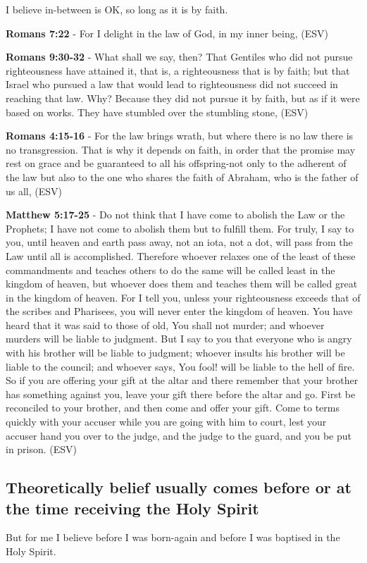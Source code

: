 \documentclass[11pt]{article}
\begin{document}
I believe in-between is OK, so long as it is by faith.

\textbf{Romans 7:22} - For I delight in the law of God, in my inner being, (ESV)

\textbf{Romans 9:30-32} - What shall we say, then? That Gentiles who did not pursue righteousness have attained it, that is, a righteousness that is by faith; but that Israel who pursued a law that would lead to righteousness did not succeed in reaching that law. Why? Because they did not pursue it by faith, but as if it were based on works. They have stumbled over the stumbling stone, (ESV)

\textbf{Romans 4:15-16} - For the law brings wrath, but where there is no law there is no transgression. That is why it depends on faith, in order that the promise may rest on grace and be guaranteed to all his offspring-not only to the adherent of the law but also to the one who shares the faith of Abraham, who is the father of us all, (ESV)

\textbf{Matthew 5:17-25} - Do not think that I have come to abolish the Law or the Prophets; I have not come to abolish them but to fulfill them. For truly, I say to you, until heaven and earth pass away, not an iota, not a dot, will pass from the Law until all is accomplished. Therefore whoever relaxes one of the least of these commandments and teaches others to do the same will be called least in the kingdom of heaven, but whoever does them and teaches them will be called great in the kingdom of heaven. For I tell you, unless your righteousness exceeds that of the scribes and Pharisees, you will never enter the kingdom of heaven. You have heard that it was said to those of old, You shall not murder; and whoever murders will be liable to judgment. But I say to you that everyone who is angry with his brother will be liable to judgment; whoever insults his brother will be liable to the council; and whoever says, You fool! will be liable to the hell of fire. So if you are offering your gift at the altar and there remember that your brother has something against you, leave your gift there before the altar and go. First be reconciled to your brother, and then come and offer your gift. Come to terms quickly with your accuser while you are going with him to court, lest your accuser hand you over to the judge, and the judge to the guard, and you be put in prison. (ESV)

\subsection{Theoretically belief usually comes before or at the time receiving the Holy Spirit}
\label{sec:org3c2b833}
But for me I believe before I was born-again and before I was baptised in the Holy Spirit.
\end{document}
